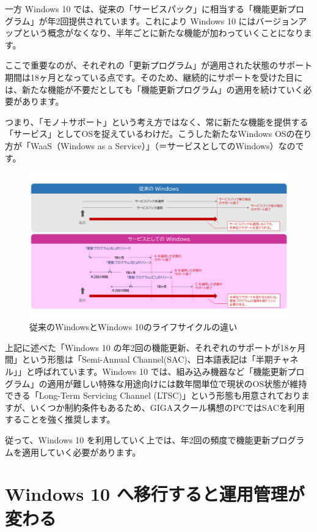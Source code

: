 一方 Windows 10 では、従来の「サービスパック」に相当する「機能更新プログラム」が年2回提供されています。これにより Windows 10 にはバージョンアップという概念がなくなり、半年ごとに新たな機能が加わっていくことになります。

ここで重要なのが、それぞれの「更新プログラム」が適用された状態のサポート期間は18ヶ月となっている点です。そのため、継続的にサポートを受けた目には、新たな機能が不要だとしても「機能更新プログラム」の適用を続けていく必要があります。

つまり、「モノ＋サポート」という考え方ではなく、常に新たな機能を提供する「サービス」としてOSを捉えているわけだ。こうした新たなWindows OSの在り方が「WaaS（Windows as a Service）」（＝サービスとしてのWindows）なのです。

\begin{figure}[htbp]
    \centering
    \includegraphics[width=16cm]{figures/WaaS.png}
    \caption{従来のWindowsとWindows 10のライフサイクルの違い}
    \label{}
\end{figure}

上記に述べた「Windows 10 の年2回の機能更新、それぞれのサポートが18ヶ月間」という形態は「Semi-Annual Channel(SAC)、日本語表記は「半期チャネル」」と呼ばれています。Windows 10 では、組み込み機器など「機能更新プログラム」の適用が難しい特殊な用途向けには数年間単位で現状のOS状態が維持できる「Long-Term Servicing Channel (LTSC)」という形態も用意されておりますが、いくつか制約条件もあるため、GIGAスクール構想のPCではSACを利用することを強く推奨します。

従って、Windows 10 を利用していく上では、年2回の頻度で機能更新プログラムを適用していく必要があります。

\section{Windows 10 へ移行すると運用管理が変わる}

